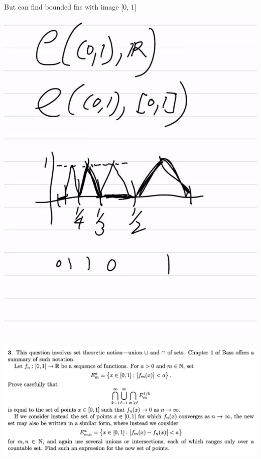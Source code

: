 \begin{enumerate}
  But can find bounded fns with image [0, 1]

  \begin{mdframed}
    \includegraphics[width=400pt]{img/analysis--berkeley-202a-hw-7459.png}
  \end{mdframed}
\end{enumerate}


\newpage
\begin{mdframed}
  \includegraphics[width=400pt]{img/analysis--berkeley-202a--homework-1-8349.png}
\end{mdframed}


